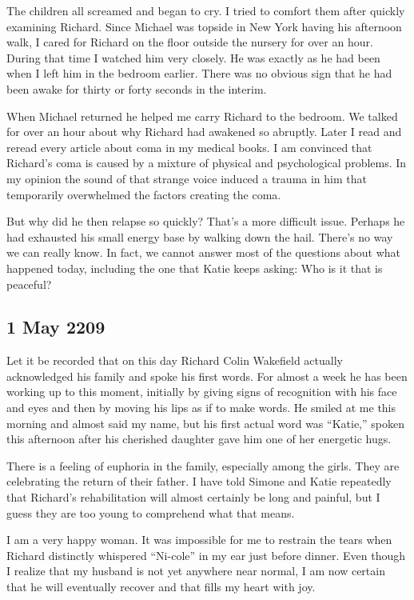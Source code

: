 \documentclass[]{article}
\begin{document}
{The children all screamed and began to cry.  I tried to comfort them after quickly examining Richard.  Since Michael was topside in New York having his afternoon walk, I cared for Richard on the floor outside the nursery for over an hour.  During that time I watched him very closely.  He was exactly as he had been when I left him in the bedroom earlier.  There was no obvious sign that he had been awake for thirty or forty seconds in the interim.

When Michael returned he helped me carry Richard to the bedroom.  We talked for over an hour about why Richard had awakened so abruptly.  Later I read and reread every article about coma in my medical books.  I am convinced that Richard’s coma is caused by a mixture of physical and psychological problems.  In my opinion the sound of that strange voice induced a trauma in him that temporarily overwhelmed the factors creating the coma.

But why did he then relapse so quickly? That’s a more difficult issue.  Perhaps he had exhausted his small energy base by walking down the hail.  There’s no way we can really know.  In fact, we cannot answer most of the questions about what happened today, including the one that Katie keeps asking: Who is it that is peaceful?

\subsection*{1 May 2209}

Let it be recorded that on this day Richard Colin Wakefield actually acknowledged his family and spoke his first words.  For almost a week he has been working up to this moment, initially by giving signs of recognition with his face and eyes and then by moving his lips as if to make words.  He smiled at me this morning and almost said my name, but his first actual word was “Katie,” spoken this afternoon after his cherished daughter gave him one of her energetic hugs.

There is a feeling of euphoria in the family, especially among the girls.  They are celebrating the return of their father.  I have told Simone and Katie repeatedly that Richard’s rehabilitation will almost certainly be long and painful, but I guess they are too young to comprehend what that means.

I am a very happy woman.  It was impossible for me to restrain the tears when Richard distinctly whispered “Ni-cole” in my ear just before dinner.  Even though I realize that my husband is not yet anywhere near normal, I am now certain that he will eventually recover and that fills my heart with joy.

}
\end{document}
